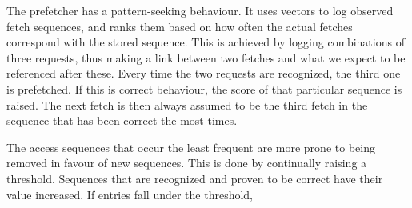 The prefetcher has a pattern-seeking behaviour. It uses vectors to log observed fetch sequences, and ranks them based on how often the actual fetches correspond with the stored sequence. This is achieved by logging combinations of three requests, thus making a link between two fetches and what we expect to be referenced after these. Every time the two requests are recognized, the third one is prefetched. If this is correct behaviour, the score of that particular sequence is raised. The next fetch is then always assumed to be the third fetch in the sequence that has been correct the most times.


The access sequences that occur the least frequent are more prone to being removed in favour of new sequences. This is done by continually raising a threshold. Sequences that are recognized and proven to be correct have their value increased. If entries fall under the threshold, 
